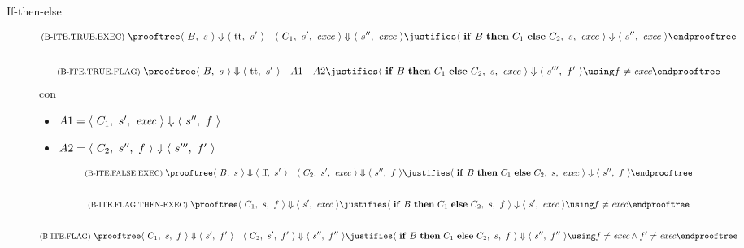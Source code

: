 \begin{description}
\item[If-then-else]
\begin{gather*}
  \rulename{B-ITE.TRUE.EXEC}
  \prooftree
    \config{B}{s} \Downarrow \config{\textrm{tt}}{s'}
      \quad 
      \configG{C_1}{s'}{\fexec} \Downarrow \config{s''}{\fexec}
    \justifies
      \configG{\textrm{$\kw{if}$ $B$ $\kw{then}$ $C_1$ $\kw{else}$ $C_2$}}{s}{\fexec} \Downarrow \config{s''}{\fexec}
  \endprooftree
  \\[2em]
  \rulename{B-ITE.TRUE.FLAG}
  \prooftree
    \config{B}{s} \Downarrow \config{\textrm{tt}}{s'}
      \quad 
      A1
      \quad
      A2
    \justifies
      \configG{\textrm{$\kw{if}$ $B$ $\kw{then}$ $C_1$ $\kw{else}$ $C_2$}}{s}{\fexec} \Downarrow \config{s'''}{f'}
    \using f \neq \fexec
  \endprooftree
\end{gather*}
con
\begin{itemize}
\item $A1 = \langle\ C_1,\ s',\ \textit{exec}\ \rangle \Downarrow \langle\ s'',\ f\ \rangle$
\item $A2 = \langle\ C_2,\ s'',\ f\ \rangle \Downarrow \langle\ s''',\ f'\ \rangle$
\end{itemize}
\begin{gather*}
  \rulename{B-ITE.FALSE.EXEC}
  \prooftree
    \config{B}{s} \Downarrow \config{\textrm{ff}}{s'}
      \quad 
      \configG{C_2}{s'}{\fexec} \Downarrow \config{s''}{f}
    \justifies
      \configG{\textrm{$\kw{if}$ $B$ $\kw{then}$ $C_1$ $\kw{else}$ $C_2$}}{s}{\fexec} \Downarrow \config{s''}{f}
  \endprooftree
  \\[2em]
  \rulename{B-ITE.FLAG.THEN-EXEC}
  \prooftree
      \configG{C_1}{s}{f} \Downarrow \config{s'}{\fexec}
    \justifies
      \configG{\textrm{$\kw{if}$ $B$ $\kw{then}$ $C_1$ $\kw{else}$ $C_2$}}{s}{f} \Downarrow \config{s'}{\fexec}
    \using f \neq \fexec
  \endprooftree
  \\[2em]
  \rulename{B-ITE.FLAG}
  \prooftree
      \configG{C_1}{s}{f} \Downarrow \config{s'}{f'}
      \quad
      \configG{C_2}{s'}{f'} \Downarrow \config{s''}{f''}
    \justifies
      \configG{\textrm{$\kw{if}$ $B$ $\kw{then}$ $C_1$ $\kw{else}$ $C_2$}}{s}{f} \Downarrow \config{s''}{f''}
    \using f \neq \fexec \land f' \neq \fexec
  \endprooftree
\end{gather*}



\end{description}
